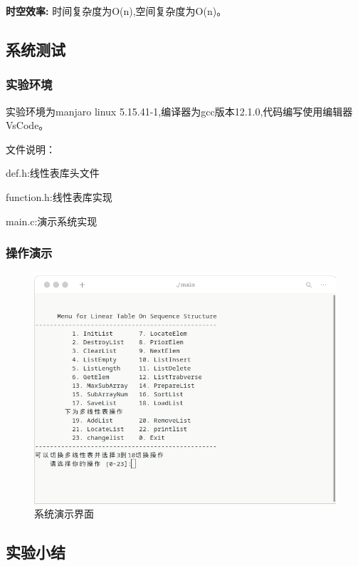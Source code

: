 \documentclass[supercite]{Experimental_Report}
\theoremstyle{definition}
\begin{document}
\textbf{时空效率: }时间复杂度为O(n),空间复杂度为O(n)。\\


\subsection{系统测试}

\subsubsection{实验环境}

实验环境为manjaro linux 5.15.41-1,编译器为gcc版本12.1.0,代码编写使用编辑器VsCode。

文件说明：

def.h:线性表库头文件

function.h:线性表库实现

main.c:演示系统实现

\subsubsection{操作演示}

\begin{figure}[htb]
	\begin{center}
		\includegraphics[scale=0.60]{images/1-1.png}
		\caption{系统演示界面}
		\label{fig1-1}
		\end{center}
\end{figure}


\subsection{实验小结}
\end{document}
